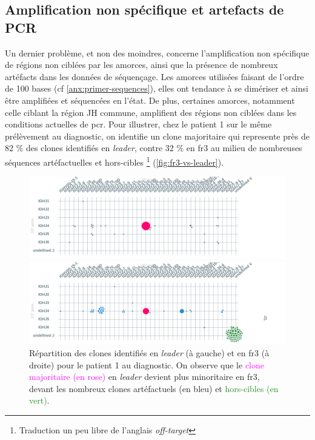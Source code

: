 \subsection{Amplification non spécifique et artefacts de PCR}

Un dernier problème, et non des moindres, concerne l'amplification non
spécifique de régions non ciblées par les amorces, ainsi que la présence de
nombreux artéfacts dans les données de séquençage. Les amorces utilisées
faisant de l'ordre de 100 bases (cf \autoref{anx:primer-sequences}), elles ont
tendance à se dimériser et ainsi être amplifiées et séquencées en l'état. De
plus, certaines amorces, notamment celle ciblant la région JH commune,
amplifient des régions non ciblées dans les conditions actuelles de \gls{pcr}.
Pour illustrer, chez le patient 1 sur le même prélèvement au diagnostic, on identifie 
un clone majoritaire qui represente près de 82 \% des clones identifiés en \textit{leader}, 
contre 32 \% en \gls{fr}3 au milieu de nombreuses séquences artéfactuelles et hors-cibles 
\footnote{Traduction un peu libre de l'anglais \textit{off-target}} (\autoref{fig:fr3-vs-leader}).

\begin{figure}[H]
    \begin{minipage}{0.50\textwidth}
        \centering
        \includegraphics[width=1\textwidth]{images/diag_leader.png}
    \end{minipage}
    \begin{minipage}{0.50\textwidth}
        \centering
        \includegraphics[width=1\textwidth]{images/diag_fr3.png}
    \end{minipage}
    \caption{
        Répartition des clones identifiés en \textit{leader} (à gauche) et en \gls{fr}3 (à droite)
        pour le patient 1 au diagnostic. On observe que le \textcolor{Magenta}{clone majoritaire (en rose)}
        en \textit{leader} devient plus minoritaire en \gls{fr}3, devant les \textcolor{ProcessBlue}{nombreux clones artéfactuels (en bleu)}
        et \textcolor{ForestGreen}{hors-cibles (en vert)}.
    }
    \label{fig:fr3-vs-leader}
\end{figure}

